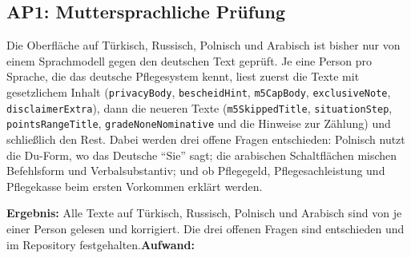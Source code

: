 \documentclass[11pt,a4paper,parskip=half-]{scrartcl}
\begin{document}
\subsection*{AP1: Muttersprachliche Prüfung}
Die Oberfläche auf Türkisch, Russisch, Polnisch und Arabisch ist bisher nur von einem
Sprachmodell gegen den deutschen Text geprüft. Je eine Person pro Sprache, die das deutsche
Pflegesystem kennt, liest zuerst die Texte mit gesetzlichem Inhalt
(\texttt{privacyBody}, \texttt{bescheidHint}, \texttt{m5CapBody}, \texttt{exclusiveNote},
\texttt{disclaimerExtra}), dann die neueren Texte
(\texttt{m5SkippedTitle}, \texttt{situationStep}, \texttt{pointsRangeTitle},
\texttt{gradeNoneNominative} und die Hinweise zur Zählung) und schließlich den Rest.
Dabei werden drei offene Fragen entschieden: Polnisch nutzt die Du-Form, wo das Deutsche
\enquote{Sie} sagt; die arabischen Schaltflächen mischen Befehlsform und Verbalsubstantiv;
und ob Pflegegeld, Pflegesachleistung und Pflegekasse beim ersten Vorkommen erklärt werden.
\par\textbf{Ergebnis:} Alle Texte auf Türkisch, Russisch, Polnisch und Arabisch sind von je einer Person gelesen und korrigiert. Die drei offenen Fragen sind entschieden und im Repository festgehalten.\quad \textbf{Aufwand:} 
\end{document}
